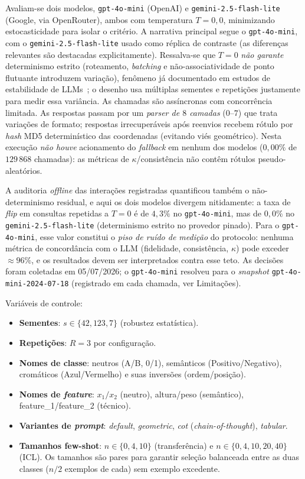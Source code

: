\documentclass[12pt,a4paper]{article}
\begin{document}
Avaliam-se dois modelos, \texttt{gpt-4o-mini} (OpenAI) e \texttt{gemini-2.5-flash-lite}
(Google, via OpenRouter), ambos com temperatura $T = 0{,}0$, minimizando estocasticidade
para isolar o critério. A narrativa principal segue o \texttt{gpt-4o-mini}, com o
\texttt{gemini-2.5-flash-lite} usado como réplica de contraste (as diferenças relevantes
são destacadas explicitamente). Ressalva-se que $T=0$ \emph{não garante} determinismo
estrito (roteamento, \emph{batching} e não-associatividade de ponto flutuante introduzem
variação), fenômeno já documentado em estudos de estabilidade de
LLMs~\cite{atilLLMStability2024, windischOneRun2026}; o desenho usa múltiplas sementes e
repetições justamente para medir essa variância.
As chamadas são assíncronas com concorrência limitada. As respostas passam por um \emph{parser
de $8$ camadas} ($0$–$7$) que trata variações de formato; respostas irrecuperáveis após
reenvios recebem rótulo por \emph{hash} MD5 determinístico das coordenadas (evitando viés
geométrico). Nesta execução \emph{não houve} acionamento do \emph{fallback} em nenhum dos
modelos ($0{,}00\%$ de $129\,868$ chamadas): as métricas de $\kappa$/consistência não contêm
rótulos pseudo-aleatórios.

A auditoria \emph{offline} das interações registradas quantificou também o não-determinismo
residual, e aqui os dois modelos divergem nitidamente: a taxa de \emph{flip} em consultas
repetidas a $T=0$ é de $4{,}3\%$ no \texttt{gpt-4o-mini}, mas de $0{,}0\%$ no
\texttt{gemini-2.5-flash-lite} (determinismo estrito no provedor pinado). Para o
\texttt{gpt-4o-mini}, esse valor constitui o \emph{piso de ruído de medição} do protocolo:
nenhuma métrica de concordância com o LLM (fidelidade, consistência, $\kappa$) pode exceder
$\approx 96\%$, e os resultados devem ser interpretados contra esse teto. As decisões foram
coletadas em 05/07/2026; o \texttt{gpt-4o-mini} resolveu para o \emph{snapshot}
\texttt{gpt-4o-mini-2024-07-18} (registrado em cada chamada, ver Limitações).

Variáveis de controle:
\begin{itemize}
  \item \textbf{Sementes}: $s \in \{42, 123, 7\}$ (robustez estatística).
  \item \textbf{Repetições}: $R = 3$ por configuração.
  \item \textbf{Nomes de classe}: neutros (A/B, 0/1), semânticos (Positivo/Negativo),
    cromáticos (Azul/Vermelho) e suas inversões (ordem/posição).
  \item \textbf{Nomes de \emph{feature}}: $x_1/x_2$ (neutro), altura/peso (semântico),
    feature\_1/feature\_2 (técnico).
  \item \textbf{Variantes de \emph{prompt}}: \emph{default}, \emph{geometric}, \emph{cot}
    (\emph{chain-of-thought}), \emph{tabular}.
  \item \textbf{Tamanhos few-shot}: $n \in \{0,4,10\}$ (transferência) e
    $n \in \{0,4,10,20,40\}$ (ICL). Os tamanhos são pares para garantir seleção
    balanceada entre as duas classes ($n/2$ exemplos de cada) sem exemplo excedente.
\end{itemize}
\end{document}
